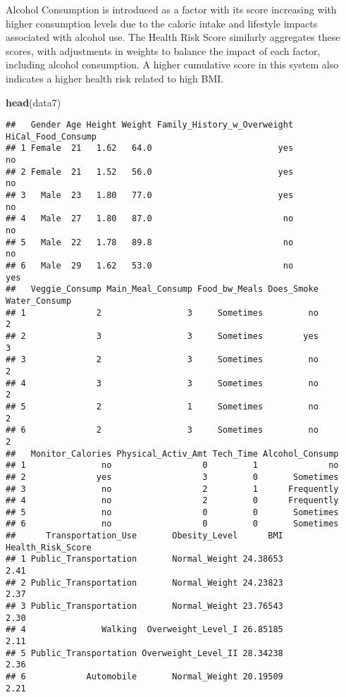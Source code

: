\documentclass[
]{article}
\newenvironment{Shaded}{\begin{snugshade}}{\end{snugshade}}
\newcommand{\FunctionTok}[1]{\textcolor[rgb]{0.13,0.29,0.53}{\textbf{#1}}}
\newcommand{\NormalTok}[1]{#1}
\begin{document}
Alcohol Consumption is introduced as a factor with its score increasing
with higher consumption levels due to the caloric intake and lifestyle
impacts associated with alcohol use. The Health Risk Score similarly
aggregates these scores, with adjustments in weights to balance the
impact of each factor, including alcohol consumption. A higher
cumulative score in this system also indicates a higher health risk
related to high BMI.

\begin{Shaded}
\begin{Highlighting}[]
\FunctionTok{head}\NormalTok{(data7)}
\end{Highlighting}
\end{Shaded}

\begin{verbatim}
##   Gender Age Height Weight Family_History_w_Overweight HiCal_Food_Consump
## 1 Female  21   1.62   64.0                         yes                 no
## 2 Female  21   1.52   56.0                         yes                 no
## 3   Male  23   1.80   77.0                         yes                 no
## 4   Male  27   1.80   87.0                          no                 no
## 5   Male  22   1.78   89.8                          no                 no
## 6   Male  29   1.62   53.0                          no                yes
##   Veggie_Consump Main_Meal_Consump Food_bw_Meals Does_Smoke Water_Consump
## 1              2                 3     Sometimes         no             2
## 2              3                 3     Sometimes        yes             3
## 3              2                 3     Sometimes         no             2
## 4              3                 3     Sometimes         no             2
## 5              2                 1     Sometimes         no             2
## 6              2                 3     Sometimes         no             2
##   Monitor_Calories Physical_Activ_Amt Tech_Time Alcohol_Consump
## 1               no                  0         1              no
## 2              yes                  3         0       Sometimes
## 3               no                  2         1      Frequently
## 4               no                  2         0      Frequently
## 5               no                  0         0       Sometimes
## 6               no                  0         0       Sometimes
##      Transportation_Use       Obesity_Level      BMI Health_Risk_Score
## 1 Public_Transportation       Normal_Weight 24.38653              2.41
## 2 Public_Transportation       Normal_Weight 24.23823              2.37
## 3 Public_Transportation       Normal_Weight 23.76543              2.30
## 4               Walking  Overweight_Level_I 26.85185              2.11
## 5 Public_Transportation Overweight_Level_II 28.34238              2.36
## 6            Automobile       Normal_Weight 20.19509              2.21
\end{verbatim}
\end{document}
